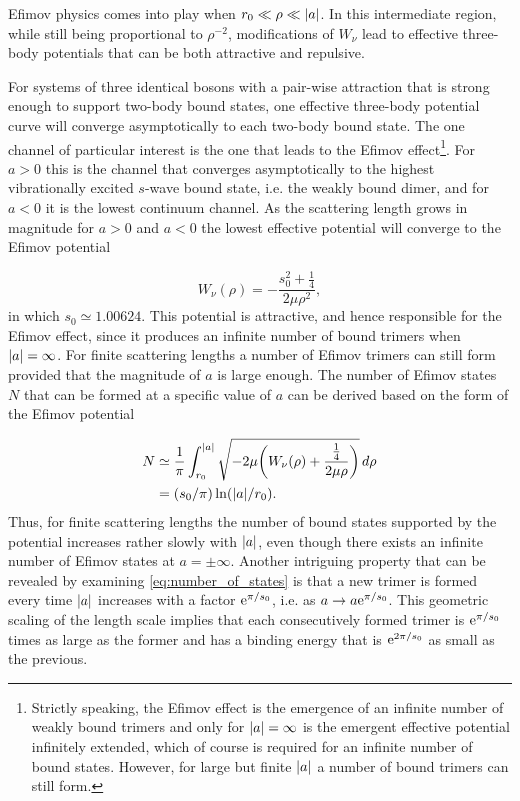 Efimov physics comes into play when $r_0 \ll \rho \ll \lvert a\rvert$. In this intermediate region, while still being proportional to $\rho^{-2}$, modifications of $W_{\nu}$ lead to effective three-body potentials that can be both attractive and repulsive. 

For systems of three identical bosons with a pair-wise attraction that is strong enough to support two-body bound states, one effective three-body potential curve will converge asymptotically to each two-body bound state. The one channel of particular interest is the one that leads to the Efimov effect\footnote{Strictly speaking, the Efimov effect is the emergence of an infinite number of weakly bound trimers and only for $\lvert a\rvert = \infty$ is the emergent effective potential infinitely extended, which of course is required for an infinite number of bound states. However, for large but finite $\lvert a\rvert$ a number of bound trimers can still form.}. For $a>0$ this is the channel that converges asymptotically to the highest vibrationally excited $s$-wave bound state, i.e. the weakly bound dimer, and for $a<0$ it is the lowest continuum channel.  As the scattering length grows in magnitude for $a>0$ and $a<0$ the lowest effective potential will converge to the Efimov potential 

\begin{equation}\label{eq:efimov_channel}
W_{\nu}(\rho) = -\frac{s_0^2+\frac{1}{4}}{2\mu \rho^2},
\end{equation} 
in which $s_0 \simeq 1.00624$. This potential is attractive, and hence responsible for the Efimov effect, since it produces an infinite number of bound trimers when $\lvert a\rvert = \infty$. For finite scattering lengths a number of Efimov trimers can still form provided that the magnitude of $a$ is large enough. The number of Efimov states $N$ that can be formed at a specific value of $a$ can be derived based on the form of the Efimov potential \cite{WANG20131}

\begin{equation}\label{eq:number_of_states}
\begin{aligned}
N & \simeq \frac{1}{\pi} \int_{r_0}^{\lvert a\rvert} \sqrt{-2\mu\bigg(W_{\nu}(\rho) + \frac{\frac{1}{4}}{2\mu \rho}\bigg)} \,d\rho \\
&= (s_0/\pi)\ln(\lvert a\rvert/r_0).
\end{aligned}
\end{equation}
Thus, for finite scattering lengths the number of bound states supported by the potential increases rather slowly with $\lvert a\rvert$,
even though there exists an infinite number of Efimov states at $a=\pm \infty$. Another intriguing property that can be revealed by examining \eqref{eq:number_of_states} is that a new trimer is formed every time $\lvert a\rvert$ increases with a factor $\mathrm{e}^{\pi/s_0}$, i.e. as $a \rightarrow a\mathrm{e}^{\pi/s_0}$. This geometric scaling of the length scale implies that each consecutively formed trimer is $\mathrm{e}^{\pi/s_0}$ times as large as the former and has a binding energy that is $\mathrm{e}^{2\pi/s_0}$ as small as the previous. 

